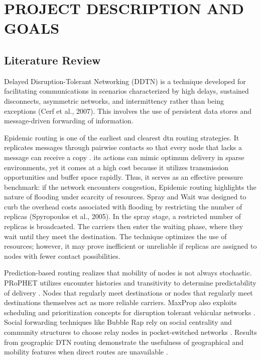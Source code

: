 \chapter{\MakeUppercase{Project Description and Goals}}
\section{Literature Review}
Delayed Disruption-Tolerant Networking (DDTN) is a technique developed for facilitating communications in scenarios characterized by high delays, sustained disconnects, asymmetric networks, and intermittency rather than being exceptions (Cerf et al., 2007). This involves the use of persistent data stores and message-driven forwarding of information.

Epidemic routing is one of the earliest and clearest \ac{dtn} routing strategies. It replicates messages through pairwise contacts so that every node that lacks a message can receive a copy \citep{vahdat2000epidemic}. its actions can mimic optimum delivery in sparse environments, yet it comes at a high cost
because it utilizes transmission opportunities and buffer space rapidly. Thus, it serves as an effective
pressure benchmark: if the network encounters congestion, Epidemic routing highlights the nature of
flooding under scarcity of resources.
Spray and Wait was designed to curb the overhead costs associated with flooding by restricting the
number of replicas (Spyropoulos et al., 2005). In the spray stage, a restricted number of replicas is
broadcasted. The carriers then enter the waiting phase, where they wait until they meet the destination.
The technique optimizes the use of resources; however, it may prove inefficient or unreliable if replicas
are assigned to nodes with fewer contact possibilities.

Prediction-based routing realizes that mobility of nodes is not always stochastic.
PRoPHET utilizes encounter histories and transitivity to determine predictability of
delivery \citep{lindgren2012prophet}. Nodes that regularly meet destinations or nodes
that regularly meet destinations themselves act as more reliable carriers. MaxProp
also exploits scheduling and prioritization concepts for disruption tolerant vehicular
networks \citep{burgess2006maxprop}. Social forwarding techniques like Bubble Rap rely on
social centrality and community structures to choose relay nodes in pocket-switched
networks \citep{hui2008bubble}. Results from geographic DTN routing demonstrate the usefulness
of geographical and mobility features when direct routes are unavailable \citep{wang2016geographic}.

